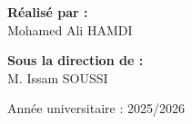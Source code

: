 \begin{titlepage}
\begin{center}
\begin{minipage}[t]{0.45\linewidth}
   \flushleft
   \textbf{Réalisé par :}\\
   Mohamed Ali HAMDI
\end{minipage}
\hfill
\begin{minipage}[t]{0.45\linewidth}
   \flushright
   \textbf{Sous la direction de :}\\
   M. Issam SOUSSI
\end{minipage}

\vfill

{\large Année universitaire : 2025/2026}

\end{center}
\end{titlepage}